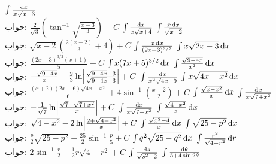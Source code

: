 $\int\frac{\dif x}{x\sqrt{x-3}}$\\
جواب:\quad
$\tfrac{2}{\sqrt{3}}(\tan^{-1}\sqrt{\tfrac{x-3}{3}})+C$
$\int\frac{\dif x}{x\sqrt{x+4}}$
$\int\frac{x\dif x}{\sqrt{x-2}}$\\
جواب:\quad
$\sqrt{x-2}(\tfrac{2(x-2)}{3}+4)+C$
$\int\frac{x\dif x}{(2x+3)^{3/2}}$
$\int x\sqrt{2x-3}\dif x$\\
جواب:\quad
$\tfrac{(2x-3)^{3/2}(x+1)}{5}+C$
$\int x(7x+5)^{3/2}\dif x$
$\int \frac{\sqrt{9-4x}}{x^2}\dif x$\\
جواب:\quad
$\tfrac{-\sqrt{9-4x}}{x}-\tfrac{2}{3}\ln\abs{\tfrac{\sqrt{9-4x}-3}{\sqrt{9-4x}+3}}+C$
$\int\frac{\dif x}{x^2\sqrt{4x-9}}$
$\int x\sqrt{4x-x^2}\dif x$\\
جواب:\quad
$\tfrac{(x+2)(2x-6)\sqrt{4x-x^2}}{6}+4\sin^{-1}(\tfrac{x-2}{2})+C$
$\int\frac{\sqrt{x-x^2}}{x}\dif x$
$\int\frac{\dif x}{x\sqrt{7+x^2}}$\\
جواب:\quad
$-\tfrac{1}{\sqrt{7}}\ln\abs{\tfrac{\sqrt{7}+\sqrt{7+x^2}}{x}}+C$
$\int\frac{\dif x}{x\sqrt{7-x^2}}$
$\int\frac{\sqrt{4-x^2}}{x}\dif x$\\
جواب:\quad
$\sqrt{4-x^2}-2\ln\abs{\tfrac{2+\sqrt{4-x^2}}{x}}+C$
$\int\frac{\sqrt{x^2-4}}{x}\dif x$
$\int\sqrt{25-p^2}\dif x$\\
جواب:\quad
$\tfrac{p}{2}\sqrt{25-p^2}+\tfrac{25}{2}\sin^{-1}\tfrac{p}{5}+C$
$\int q^2\sqrt{25-q^2}\dif x$
$\int \frac{r^2}{\sqrt{4-r^2}}\dif r$\\
جواب:\quad
$2\sin^{-1}\tfrac{r}{2}-\tfrac{1}{2}r\sqrt{4-r^2}+C$
$\int \frac{\dif s}{\sqrt{s^2-2}}$
$\int\frac{\dif \theta}{5+4\sin 2\theta}$\\
